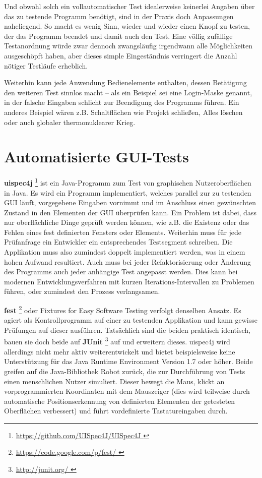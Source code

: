 Und obwohl solch ein vollautomatischer Test idealerweise keinerlei Angaben
über das zu testende Programm benötigt, sind in der Praxis doch Anpassungen
naheliegend. So macht es wenig Sinn, wieder und wieder einen Knopf zu testen,
der das Programm beendet und damit auch den Test. Eine völlig zufällige
Testanordnung würde zwar dennoch zwangsläufig irgendwann alle Möglichkeiten
ausgeschöpft haben, aber dieses simple Eingeständnis verringert die
Anzahl nötiger Testläufe erheblich.

Weiterhin kann jede Anwendung Bedienelemente enthalten, dessen Betätigung
den weiteren Test sinnlos macht -- als ein Beispiel sei eine Login-Maske genannt,
in der falsche Eingaben schlicht zur Beendigung des Programms führen.
Ein anderes Beispiel wären z.B. Schaltflächen wie
\glqq{}Projekt schließen\grqq{}, \glqq{}Alles löschen\grqq{} oder auch 
\glqq{}globaler thermonuklearer Krieg\grqq{}.


\section{Automatisierte GUI-Tests}\label{section:automatedguitesting}


\textbf{uispec4j} \footnote{\url{ https://github.com/UISpec4J/UISpec4J }} ist ein Java-Programm 
zum Test von graphischen Nutzeroberflächen
in Java. Es wird ein Programm implementiert, welches parallel zur zu testenden GUI läuft,
vorgegebene Eingaben vornimmt und im Anschluss einen gewünschten Zustand in den Elementen der GUI
überprüfen kann. Ein Problem ist dabei, dass nur oberflächliche Dinge geprüft werden können,
wie z.B. die Existenz oder das Fehlen eines fest definierten Fensters oder Elements. Weiterhin muss für jede
Prüfanfrage ein Entwickler ein entsprechendes Testsegment schreiben. Die Applikation muss also
zumindest doppelt implementiert werden, was in einem hohen Aufwand resultiert. Auch muss bei jeder
Refaktorisierung oder Änderung des Programms auch jeder anhängige Test angepasst werden.
Dies kann bei modernen Entwicklungsverfahren mit kurzen Iterations-Intervallen zu Problemen führen,
oder zumindest den Prozess verlangsamen.


\vspace{0.5cm}

\textbf{fest} \footnote{\url{ https://code.google.com/p/fest/ }} oder 
\glqq{}Fixtures for Easy Software Testing\grqq{} verfolgt denselben Ansatz.
Es agiert als Kontrollprogramm auf einer zu testenden Applikation und kann gewisse Prüfungen
auf dieser ausführen. Tatsächlich sind die beiden praktisch identisch, bauen sie doch beide
auf \textbf{JUnit} \footnote{\url{ http://junit.org/ }} auf und erweitern dieses.
uispec4j wird allerdings nicht mehr aktiv weiterentwickelt und bietet
beispielsweise keine Unterstützung für das Java Runtime Environment Version \glqq{}1.7\grqq{}
oder höher. Beide greifen auf die Java-Bibliothek \glqq{}Robot\grqq{} zurück,
die zur Durchführung von Tests einen menschlichen Nutzer simuliert. Dieser 
bewegt die Maus, klickt an vorprogrammierten Koordinaten mit dem Mauszeiger
(dies wird teilweise durch automatische Positionserkennung von definierten Elementen
der getesteten Oberflächen verbessert) und führt vordefinierte Tastatureingaben durch.



